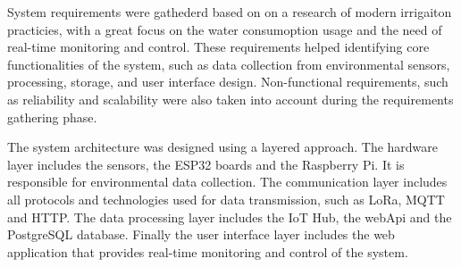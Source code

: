 System requirements were gathederd based on on a research of modern irrigaiton practicies, with a great focus on the water consumoption
usage and the need of real-time monitoring and control. These requirements helped identifying core functionalities of the system,
such as data collection from environmental sensors, processing, storage, and user interface design. Non-functional requirements,
such as reliability and scalability were also taken into account during the requirements gathering phase.

The system architecture was designed using a layered approach. The hardware layer includes the sensors, the ESP32 boards
and the Raspberry Pi. It is responsible for environmental data collection. The communication layer includes all protocols and technologies
used for data transmission, such as LoRa, MQTT and HTTP. The data processing layer includes the IoT Hub, the webApi and the PostgreSQL database.
Finally the user interface layer includes the web application that provides real-time monitoring and control of the system. 